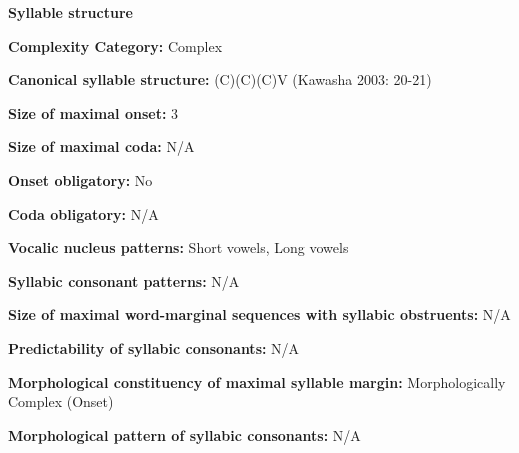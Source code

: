 \begin{styleBody}
\textbf{Syllable structure}
\end{styleBody}

\begin{styleBody}
\textbf{Complexity Category:} Complex
\end{styleBody}

\begin{styleBody}
\textbf{Canonical syllable structure:} (C)(C)(C)V\textbf{ }(Kawasha 2003: 20-21)
\end{styleBody}

\begin{styleBody}
\textbf{Size of maximal onset:} 3
\end{styleBody}

\begin{styleBody}
\textbf{Size of maximal coda:} N/A
\end{styleBody}

\begin{styleBody}
\textbf{Onset obligatory:} No
\end{styleBody}

\begin{styleBody}
\textbf{Coda obligatory:} N/A
\end{styleBody}

\begin{styleBody}
\textbf{Vocalic nucleus patterns:} Short vowels, Long vowels
\end{styleBody}

\begin{styleBody}
\textbf{Syllabic consonant patterns:} N/A
\end{styleBody}

\begin{styleBody}
\textbf{Size of maximal word{}-marginal sequences with syllabic obstruents:} N/A
\end{styleBody}

\begin{styleBody}
\textbf{Predictability of syllabic consonants:} N/A
\end{styleBody}

\begin{styleBody}
\textbf{Morphological constituency of maximal syllable margin:} Morphologically Complex (Onset)
\end{styleBody}

\begin{styleBody}
\textbf{Morphological pattern of syllabic consonants:} N/A
\end{styleBody}


